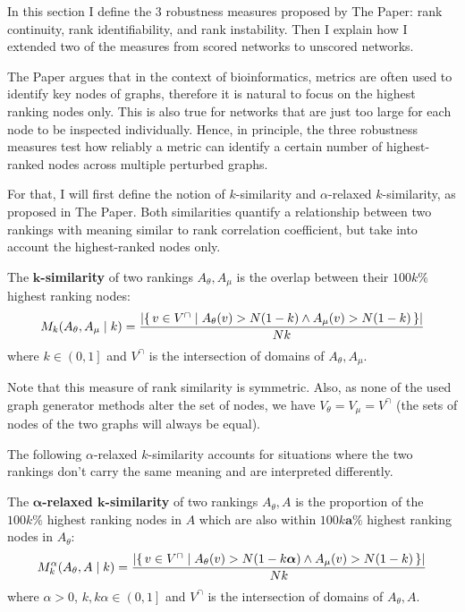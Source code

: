 In this section I define the 3 robustness measures proposed by The Paper: rank continuity, rank identifiability, and rank instability.
Then I explain how I extended two of the measures from scored networks to unscored networks.

The Paper argues that in the context of bioinformatics, metrics are often used to identify key nodes of graphs, therefore it is natural to focus on the highest ranking nodes only.
This is also true for networks that are just too large for each node to be inspected individually\citeneeded.
Hence, in principle, the three robustness measures test how reliably a metric can identify a certain number of highest-ranked nodes across multiple perturbed graphs.


For that, I will first define the notion of $k$-similarity and $\alpha$-relaxed $k$-similarity, as proposed in The Paper.
Both similarities quantify a relationship between two rankings with meaning similar to rank correlation coefficient, but take into account the highest-ranked nodes only.

\begin{definition}[$\bm{k}$-similarity]
    \label{def:k_similarity}
    The \textbf{$\bm{k}$-similarity} of two rankings $A_\theta, A_\mu$ is the overlap between their $100k\%$ highest ranking nodes:
    \[ M_k(A_\theta, A_\mu \mid k) = \frac{\left\lvert \left\{\, v \in V^{\cap} \mid  A_\theta(v) > N(1-k) \wedge A_\mu(v) > N(1-k)  \, \right\} \right\rvert}{Nk} \]
    where $k \in \left( 0, 1 \right]$ and $V^{\cap}$ is the intersection of domains of $A_\theta, A_\mu$.
\end{definition}

Note that this measure of rank similarity is symmetric.
Also, as none of the used graph generator methods alter the set of nodes, we have $V_\theta = V_\mu = V^{\cap}$ (the sets of nodes of the two graphs will always be equal).

The following $\alpha$-relaxed $k$-similarity accounts for situations where the two rankings don't carry the same meaning and are interpreted differently.

\begin{definition}
    \label{def:alpha_relaxed_k_similarity}
    The \textbf{$\bm{\alpha}$-relaxed $\bm{k}$-similarity} of two rankings $A_\theta, A$ is the proportion of the $100k\%$ highest ranking nodes in $A$ which are also within $100k\bm{a}\%$ highest ranking nodes in $A_\theta$:
    \[ M_k^\alpha(A_\theta, A \mid k) = \frac{\left\lvert \left\{\, v \in V^{\cap} \mid  A_\theta(v) > N(1-k\bm{\alpha}) \wedge A_\mu(v) > N(1-k)  \, \right\} \right\rvert}{Nk} \]
    where $\alpha > 0$, $k, k\alpha \in \left( 0, 1 \right]$ and $V^{\cap}$ is the intersection of domains of $A_\theta, A$.
\end{definition}

